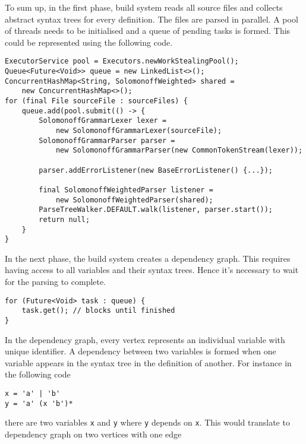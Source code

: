 To sum up, in the first phase, build system reads all source files and collects abstract syntax trees for every definition. The files are parsed in parallel. A pool of threads needs to be initialised and a queue of pending tasks is formed. This could be represented using the following code.
\begin{lstlisting}
ExecutorService pool = Executors.newWorkStealingPool();
Queue<Future<Void>> queue = new LinkedList<>();
ConcurrentHashMap<String, SolomonoffWeighted> shared = 
    new ConcurrentHashMap<>();
for (final File sourceFile : sourceFiles) {
    queue.add(pool.submit(() -> {
        SolomonoffGrammarLexer lexer =
            new SolomonoffGrammarLexer(sourceFile);
        SolomonoffGrammarParser parser =
            new SolomonoffGrammarParser(new CommonTokenStream(lexer));
        
        parser.addErrorListener(new BaseErrorListener() {...});
        
        final SolomonoffWeightedParser listener =
            new SolomonoffWeightedParser(shared);
        ParseTreeWalker.DEFAULT.walk(listener, parser.start());
        return null;
    }
}
\end{lstlisting}
In the next phase, the build system creates a dependency graph. This requires having access to all variables and their syntax trees. Hence it's necessary to wait for the parsing to complete.
\begin{lstlisting}
for (Future<Void> task : queue) {
    task.get(); // blocks until finished
}
\end{lstlisting}
In the dependency graph, every vertex represents an individual variable with
unique identifier. A dependency between two variables is formed when one variable appears in the syntax tree in the definition of another.
For instance in the following code
\begin{lstlisting}
x = 'a' | 'b'
y = 'a' (x 'b')*
\end{lstlisting}
there are two variables \texttt{x} and \texttt{y} where \texttt{y} depends on \texttt{x}. This would translate to dependency graph on two vertices with one edge
\begin{center}
\end{center}
